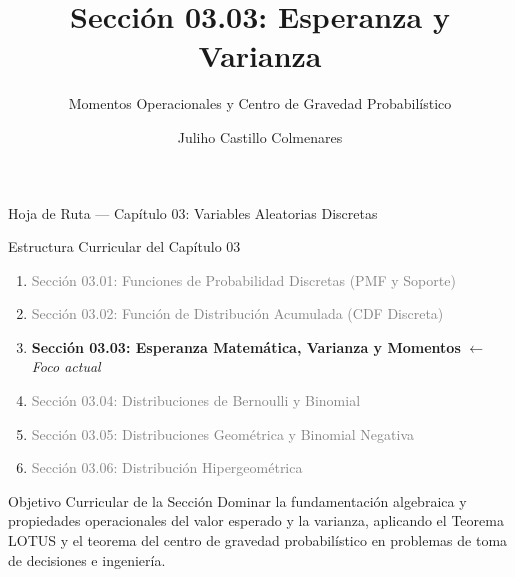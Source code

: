 \documentclass[10pt, aspectratio=169]{beamer}
\title[Esperanza y Varianza]{Sección 03.03: Esperanza y Varianza}
\subtitle{Momentos Operacionales y Centro de Gravedad Probabilístico}
\author[J. Castillo Colmenares]{Juliho Castillo Colmenares}
\institute{Tecnológico de Monterrey}
\date{\vspace{-2.0cm}}
\begin{document}
\begin{frame}[plain]
  \vspace{-0.5cm}
  \titlepage
\end{frame}

\begin{frame}{Hoja de Ruta — Capítulo 03: Variables Aleatorias Discretas}
  \begin{block}{Estructura Curricular del Capítulo 03}
    \footnotesize
    \begin{enumerate}\itemsep=0.08cm
      \item \textcolor{gray}{Sección 03.01: Funciones de Probabilidad Discretas (PMF y Soporte)}
      \item \textcolor{gray}{Sección 03.02: Función de Distribución Acumulada (CDF Discreta)}
      \item \textbf{\textcolor{TecRojo}{Sección 03.03: Esperanza Matemática, Varianza y Momentos}} $\leftarrow$ \emph{Foco actual}
      \item \textcolor{gray}{Sección 03.04: Distribuciones de Bernoulli y Binomial}
      \item \textcolor{gray}{Sección 03.05: Distribuciones Geométrica y Binomial Negativa}
      \item \textcolor{gray}{Sección 03.06: Distribución Hipergeométrica}
    \end{enumerate}
  \end{block}
  \vspace{-0.05cm}
  \pause
  \begin{alertblock}{Objetivo Curricular de la Sección}
    \footnotesize
    Dominar la fundamentación algebraica y propiedades operacionales del valor esperado y la varianza, aplicando el Teorema LOTUS y el teorema del centro de gravedad probabilístico en problemas de toma de decisiones e ingeniería.
  \end{alertblock}
\end{frame}
\end{document}
